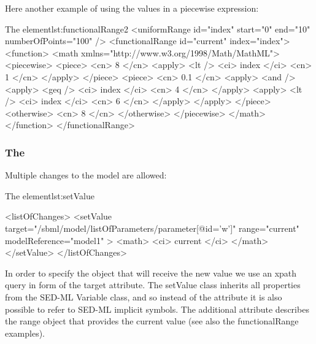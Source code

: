 Here another example of using the values in a piecewise expression: 


\begin{myXmlLst}{The  element}{lst:functionalRange2}
        <uniformRange id="index" start="0" end="10" numberOfPoints="100" />
        <functionalRange id="current" index="index">
          <function>
            <math xmlns="http://www.w3.org/1998/Math/MathML">
              <piecewise>
                <piece>
                  <cn> 8 </cn>
                  <apply>
                    <lt />
                    <ci> index </ci>
                    <cn> 1 </cn>
                  </apply>
                </piece>
                <piece>
                  <cn> 0.1 </cn>
                  <apply>
                    <and />
                    <apply>
                      <geq />
                      <ci> index </ci>
                      <cn> 4 </cn>
                    </apply>
                    <apply>
                      <lt />
                      <ci> index </ci>
                      <cn> 6 </cn>
                    </apply>
                  </apply>
                </piece>
                <otherwise>
                  <cn> 8 </cn>
                </otherwise>
              </piecewise>
            </math>
          </function>
        </functionalRange>
\end{myXmlLst}



\subsubsection{ The }
\label{class:changes}
Multiple changes to the model are allowed:
\begin{myXmlLst}{The  element}{lst:setValue}

  <listOfChanges>
    <setValue target="/sbml/model/listOfParameters/parameter[@id='w']" range="current" modelReference="model1" > 
     <math> 
         <ci> current </ci> 
     </math> 
    </setValue> 
  </listOfChanges>
\end{myXmlLst}

In order to specify the object that will receive the new value we use an xpath query in form of the target attribute. The setValue class inherits all properties from the SED-ML Variable class, and so instead of the  attribute it is also possible to refer to SED-ML implicit symbols. The additional attribute  describes the range object that provides the current value (see also the functionalRange examples).


